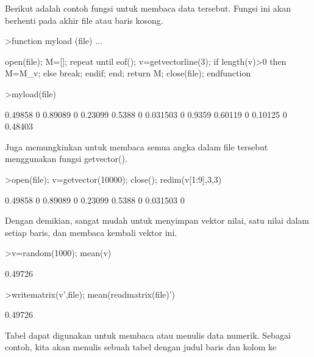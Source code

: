 \documentclass[a4paper,10pt]{article}
\begin{document}
\begin{eulernotebook}
\begin{eulercomment}
\begin{eulercomment}
\begin{eulercomment}
\begin{eulercomment}
\begin{eulercomment}
\begin{eulercomment}
\begin{eulercomment}
Berikut adalah contoh fungsi untuk membaca data tersebut. Fungsi ini
akan berhenti pada akhir file atau baris kosong.
\end{eulercomment}
\begin{eulerprompt}
>function myload (file) ...
\end{eulerprompt}
\begin{eulerudf}
  open(file);
  M=[];
  repeat
     until eof();
     v=getvectorline(3);
     if length(v)>0 then M=M_v; else break; endif;
  end;
  return M;
  close(file);
  endfunction
\end{eulerudf}
\begin{eulerprompt}
>myload(file)
\end{eulerprompt}
\begin{euleroutput}
    0.49858         0   0.89089         0   0.23099 
     0.5388         0  0.031503         0    0.9359 
    0.60119         0   0.10125         0   0.48403 
\end{euleroutput}
\begin{eulercomment}
Juga memungkinkan untuk membaca semua angka dalam file tersebut
menggunakan fungsi getvector().
\end{eulercomment}
\begin{eulerprompt}
>open(file); v=getvector(10000); close(); redim(v[1:9],3,3)
\end{eulerprompt}
\begin{euleroutput}
    0.49858         0   0.89089 
          0   0.23099    0.5388 
          0  0.031503         0 
\end{euleroutput}
\begin{eulercomment}
Dengan demikian, sangat mudah untuk menyimpan vektor nilai, satu nilai
dalam setiap baris, dan membaca kembali vektor ini.
\end{eulercomment}
\begin{eulerprompt}
>v=random(1000); mean(v)
\end{eulerprompt}
\begin{euleroutput}
  0.49726
\end{euleroutput}
\begin{eulerprompt}
>writematrix(v',file); mean(readmatrix(file)')
\end{eulerprompt}
\begin{euleroutput}
  0.49726
\end{euleroutput}
\begin{eulercomment}
Tabel dapat digunakan untuk membaca atau menulis data numerik. Sebagai
contoh, kita akan menulis sebuah tabel dengan judul baris dan kolom ke

\end{eulercomment}
\end{eulercomment}
\end{eulercomment}
\end{eulercomment}
\end{eulercomment}
\end{eulercomment}
\end{eulercomment}
\end{eulernotebook}
\end{document}
